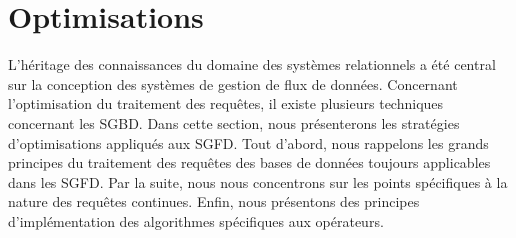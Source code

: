 \section{Optimisations}\label{sec:rw:sgfd:optim}
L'héritage des connaissances du domaine des systèmes relationnels a été central sur la conception des systèmes de gestion de flux de données. Concernant l'optimisation du traitement des requêtes, il existe plusieurs techniques concernant les SGBD. Dans cette section, nous présenterons les stratégies d'optimisations appliqués aux SGFD. Tout d'abord, nous rappelons les grands principes du traitement des requêtes des bases de données toujours applicables dans les SGFD. Par la suite, nous nous concentrons sur les points spécifiques à la nature des requêtes continues. Enfin, nous présentons des principes d'implémentation des algorithmes spécifiques aux opérateurs.
%
%
%
